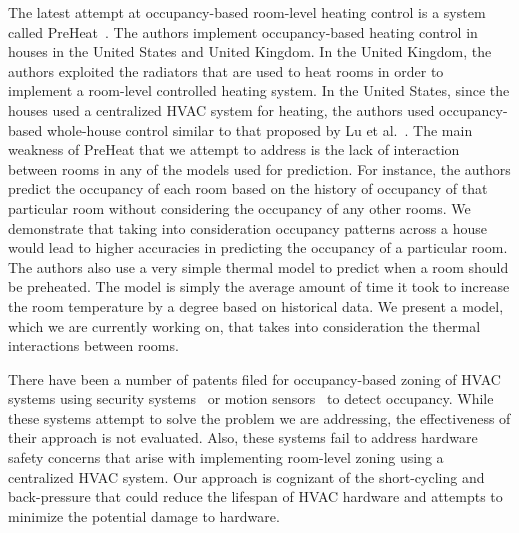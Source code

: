The latest attempt at occupancy-based room-level heating control is a system
called PreHeat~\cite{scott2011preheat}. The authors implement occupancy-based
heating control in houses in the United States and United Kingdom. In the United
Kingdom, the authors exploited the radiators that are used to heat rooms in
order to implement a room-level controlled heating system. In the United States,
since the houses used a centralized HVAC system for heating, the authors used
occupancy-based whole-house control similar to that proposed by Lu et
al.~\cite{lu2010smart}. The main weakness of PreHeat that we attempt to address
is the lack of interaction between rooms in any of the models used for
prediction. For instance, the authors predict the occupancy of each room based
on the history of occupancy of that particular room without considering the
occupancy of any other rooms. We demonstrate that taking into consideration
occupancy patterns across a house would lead to higher accuracies in predicting
the occupancy of a particular room. The authors also use a very simple thermal
model to predict when a room should be preheated. The model is simply the
average amount of time it took to increase the room temperature by a degree
based on historical data. We present a model, which we are currently working on,
that takes into consideration the thermal interactions between rooms.

There have been a number of patents filed for occupancy-based zoning of HVAC
systems using security systems~\cite{cohen2008hvac} or motion
sensors~\cite{simmons2002energy} to detect occupancy. While these systems
attempt to solve the problem we are addressing, the effectiveness of their
approach is not evaluated. Also, these systems fail to address hardware safety
concerns that arise with implementing room-level zoning using a centralized HVAC
system. Our approach is cognizant of the short-cycling and back-pressure that
could reduce the lifespan of HVAC hardware and attempts to minimize the
potential damage to hardware.

